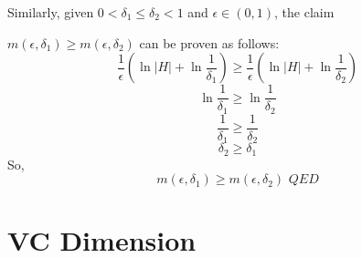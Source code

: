 \documentclass{article}
\begin{document}
\begin{enumerate}
        
        Similarly, given $0 < \delta_1 \leq \delta_2 < 1$ and $\epsilon \in (0, 1)$, the claim 
        
        $m(\epsilon, \delta_1) \geq m(\epsilon, \delta_2)$ can be proven as follows: 
        \begin{equation*}
            \frac{1}{\epsilon}(\ln{|H|} + \ln{\frac{1}{\delta_1}}) \geq \frac{1}{\epsilon}(\ln{|H|} + \ln{\frac{1}{\delta_2}})
        \end{equation*}
        \begin{equation*}
            \ln{\frac{1}{\delta_1}} \geq \ln{\frac{1}{\delta_2}}
        \end{equation*}
        \begin{equation*}
            \frac{1}{\delta_1} \geq \frac{1}{\delta_2}
        \end{equation*}
        \begin{equation*}
            \delta_2 \geq \delta_1
        \end{equation*}
        So, 
        \begin{equation*}
            m(\epsilon, \delta_1) \geq m(\epsilon, \delta_2) \textit{  QED}
        \end{equation*}
        
\end{enumerate}

\section{VC Dimension}
\end{document}
